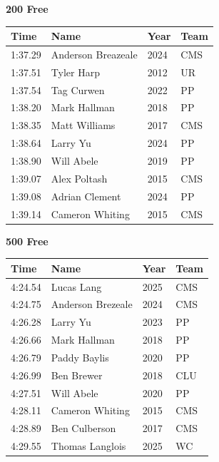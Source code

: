 \vspace{1.2em}
\noindent\begin{minipage}[t]{0.98\textwidth}
\centering
\textbf{\textcolor{teamprimary}{200 Free}}\par
\vspace{0.5em}
\centering
\small
\renewcommand{\arraystretch}{1.0}
\setlength{\tabcolsep}{4pt}
\begin{tabular}{@{}p{2.5cm}p{4.5cm}p{1.5cm}p{2.5cm}@{}}
\toprule
\textbf{Time} & \textbf{Name} & \textbf{Year} & \textbf{Team} \\
\midrule
1:37.29 & Anderson Breazeale & 2024 & CMS \\
1:37.51 & Tyler Harp & 2012 & UR \\
1:37.54 & Tag Curwen & 2022 & PP \\
1:38.20 & Mark Hallman & 2018 & PP \\
1:38.35 & Matt Williams & 2017 & CMS \\
1:38.64 & Larry Yu & 2024 & PP \\
1:38.90 & Will Abele & 2019 & PP \\
1:39.07 & Alex Poltash & 2015 & CMS \\
1:39.08 & Adrian Clement & 2024 & PP \\
1:39.14 & Cameron Whiting & 2015 & CMS \\
\bottomrule
\end{tabular}
\end{minipage}
\vspace{1.2em}
\noindent\begin{minipage}[t]{0.98\textwidth}
\centering
\textbf{\textcolor{teamprimary}{500 Free}}\par
\vspace{0.5em}
\centering
\small
\renewcommand{\arraystretch}{1.0}
\setlength{\tabcolsep}{4pt}
\begin{tabular}{@{}p{2.5cm}p{4.5cm}p{1.5cm}p{2.5cm}@{}}
\toprule
\textbf{Time} & \textbf{Name} & \textbf{Year} & \textbf{Team} \\
\midrule
4:24.54 & Lucas Lang & 2025 & CMS \\
4:24.75 & Anderson Brezeale & 2024 & CMS \\
4:26.28 & Larry Yu & 2023 & PP \\
4:26.66 & Mark Hallman & 2018 & PP \\
4:26.79 & Paddy Baylis & 2020 & PP \\
4:26.99 & Ben Brewer & 2018 & CLU \\
4:27.51 & Will Abele & 2020 & PP \\
4:28.11 & Cameron Whiting & 2015 & CMS \\
4:28.89 & Ben Culberson & 2017 & CMS \\
4:29.55 & Thomas Langlois & 2025 & WC \\
\bottomrule
\end{tabular}
\end{minipage}
